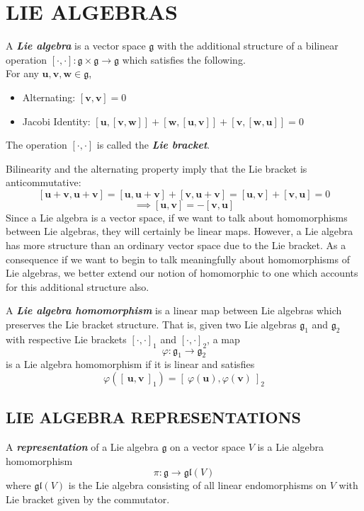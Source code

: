 \documentclass[9 pt]{report}
\def\*#1{\boldsymbol{#1}}
\begin{document}
{\centering
\section*{LIE ALGEBRAS}}
\begin{tcolorbox}
	A \textbf{\emph{Lie algebra}} is a vector space $\mathfrak{g}$ with the additional structure of a bilinear operation $[\cdot,\cdot]: \mathfrak{g}\times\mathfrak{g}\to\mathfrak{g}$ which satisfies the following.
	\\
	For any $\*u,\*v,\*w \in \mathfrak{g}$,
	
	\begin{itemize}
		\item Alternating: $[\*v, \*v]=0$
		\item Jacobi Identity: $[\*u, [\*v, \*w]] + [\*w, [\*u, \*v]] + [\*v, [\*w,\*u]]=0$
	\end{itemize}
	The operation $[\cdot,\cdot]$ is called the \textbf{\emph{Lie bracket}}.
\end{tcolorbox}
\noindent Bilinearity and the alternating property imply that the Lie bracket is anticommutative:
$$ [\*u+\*v, \*u+\*v] = [\*u, \*u + \*v] + [\*v, \*u+\*v] =  [\*u, \*v] + [\*v, \*u] = 0 $$
$$\implies [\*u,\*v] = - [\*v, \*u]$$
Since a Lie algebra is a vector space, if we want to talk about homomorphisms between Lie algebras, they will certainly be linear maps. However, a Lie algebra has more structure than an ordinary vector space due to the Lie bracket. As a consequence if we want to begin to talk meaningfully about homomorphisms of Lie algebras, we better extend our notion of homomorphic to one which accounts for this additional structure also.



\begin{tcolorbox}
	A \textbf{\emph{Lie algebra homomorphism}} is a linear map between Lie algebras which preserves the Lie bracket structure. That is, given two Lie algebras $\mathfrak{g}_1$ and $\mathfrak{g}_2$ with respective Lie brackets $[\cdot,\cdot]_1$ and $[\cdot,\cdot]_2$, a map 
	$$\varphi:\mathfrak{g}_1\to\mathfrak{g}_2$$
	is a Lie algebra homomorphism if it is linear and satisfies
	$$ \varphi\left([\:\*u,\*v\:]_1\right) = [\:\varphi(\*u), \varphi(\*v)\:]_2 $$
\end{tcolorbox}


{\centering
\subsection*{LIE ALGEBRA REPRESENTATIONS}}
\begin{tcolorbox}
	A \textbf{\emph{representation}} of a Lie algebra $\mathfrak{g}$ on a vector space $V$ is a Lie algebra homomorphism 
	$$\pi: \mathfrak{g} \to \mathfrak{gl}(V)$$
	where $\mathfrak{gl}(V)$ is the Lie algebra consisting of all linear endomorphisms on $V$ with Lie bracket given by the commutator.
\end{tcolorbox}
\end{document}
